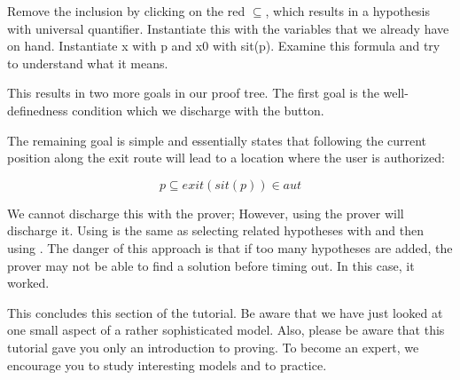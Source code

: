 
Remove the inclusion by clicking on the red $\subseteq$, which results in a hypothesis with universal quantifier. Instantiate this with the variables that we already have on hand.  Instantiate x with p and x0 with sit(p).  Examine this formula and try to understand what it means.

This results in two more goals in our proof tree. The first goal is the well-definedness condition which we discharge with the  button.

The remaining goal is simple and essentially states that following the current position along the exit route will lead to a location where the user is authorized:

$$ p \subseteq exit(sit(p)) \in aut $$

We cannot discharge this with the  prover; However, using the  prover will discharge it.  Using  is the same as selecting related hypotheses with  and then using .  The danger of this approach is that if too many hypotheses are added, the prover may not be able to find a solution before timing out.  In this case, it worked.



This concludes this section of the tutorial. Be aware that we have just looked at one small aspect of a rather sophisticated model.  Also, please be aware that this tutorial gave you only an introduction to proving.  To become an expert, we encourage you to study interesting models and to practice.


